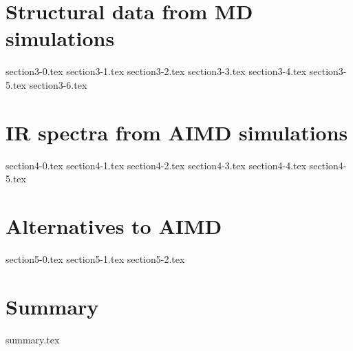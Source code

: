 \documentclass[12pt, a4paper]{report}
\begin{document}
\chapter{Structural data from MD simulations}

{section3-0.tex}
{section3-1.tex}
{section3-2.tex}
{section3-3.tex}
{section3-4.tex}
{section3-5.tex}
{section3-6.tex}

\chapter{IR spectra from AIMD simulations}

{section4-0.tex}
{section4-1.tex}
{section4-2.tex}
{section4-3.tex}
{section4-4.tex}
{section4-5.tex}

\chapter{Alternatives to AIMD}

{section5-0.tex}
{section5-1.tex}
{section5-2.tex}

\chapter{Summary}
{summary.tex}

\singlespacing
\cleardoublepage
{}
\listoffigures

\cleardoublepage
{}
\listoftables

\cleardoublepage
{}
\printbibliography[title=Bibliography, keyword=secondary, resetnumbers]
\end{document}
